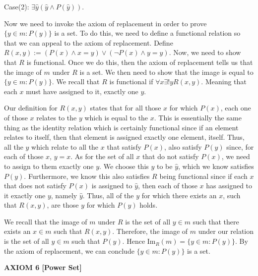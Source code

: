 \documentclass[12pt, a4paper]{article}
\begin{document}
Case(2): $\exists\hat{y}(\hat{y}\wedge P(\hat{y}))$.\par

\vspace{4mm}

\noindent Now we need to invoke the axiom of replacement in order to prove $\{y\in m\colon P(y)\}$ is a set. To do this, we need to define a functional relation so that we can appeal to the axiom of replacement. Define $R(x,y):=(P(x)\wedge x=y)\vee(\neg P(x)\wedge y=\hat{y})$. Now, we need to show that $R$ is functional. Once we do this, then the axiom of replacement tells us that the image of $m$ under $R$ is a set. We then need to show that the image is equal to $\{y\in m\colon P(y)\}$. We recall that $R$ is functional if $\forall x\exists! y R(x,y)$. Meaning that each $x$ must have assigned to it, exactly one $y$.\par
Our definition for $R(x,y)$ states that for all those $x$ for which $P(x)$, each one of those $x$ relates to the $y$ which is equal to the $x$. This is essentially the same thing as the identity relation which is certainly functional since if an element relates to itself, then that element is assigned exactly one element, itself. Thus, all the $y$ which relate to all the $x$ that satisfy $P(x)$, also satisfy $P(y)$ since, for each of those $x$, $y=x$. As for the set of all $x$ that do not satisfy $P(x)$, we need to assign to them exactly one $y$. We choose this $y$ to be $\hat{y}$, which we know satisfies $P(y)$. Furthermore, we know this also satisfies $R$ being functional since if each $x$ that does not satisfy $P(x)$ is assigned to $\hat{y}$, then each of those $x$ has assigned to it exactly one $y$, namely $\hat{y}$. Thus, all of the $y$ for which there exists an $x$, such that $R(x,y)$, are those $y$ for which $P(y)$ holds.\par
We recall that the image of $m$ under $R$ is the set of all $y\in m$ such that there exists an $x\in m$ such that $R(x,y)$. Therefore, the image of $m$ under our relation is the set of all $y\in m$ such that $P(y)$. Hence Im$_{R}(m)=\{y\in m\colon P(y)\}$. By the axiom of replacement, we can conclude $\{y\in m\colon P(y)\}$ is a set.\hspace{83mm}\square\par

\vspace{10mm}

\noindent\blacksquare\textbf{ AXIOM 6 [Power Set]}\par
\end{document}
